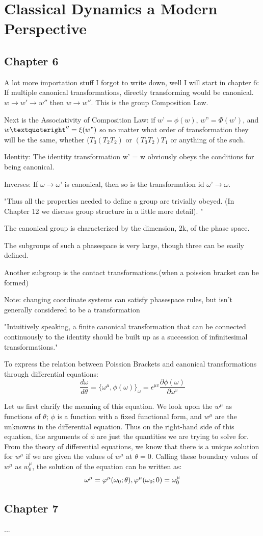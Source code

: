  \section{Classical Dynamics a Modern Perspective}
 \subsection{Chapter 6}
 A lot more importation stuff I forgot to write down, well I will start in chapter 6:
 If multiple canonical transformations, directly transforming would be canonical. $w \to w' \to w''$ then $w \to w''$. This is the group Composition Law.
 
 Next is the Associativity of Composition Law: 
 if $w’= \phi(w)$, $w” = \Phi(w’)$, and $w’'' = \xi(w")$
 so no matter what order of transformation they will be the same, whether ($T_3(T_2T_2)$ or $(T_3T_2)T_1$ or anything of the such.
 
 Identity: The identity transformation w’ = w obviously obeys the conditions for being canonical.

Inverses: If $\omega \to \omega’$ is canonical, then so is the transformation 
id $\omega’ \to \omega$. 

"Thus all the properties needed to define a group are trivially obeyed. (In 
Chapter 12 we discuss group structure in a little more detail). "

The canonical group is characterized by the dimension, 2k, 
of the phase space. 

The subgroups of such a phasespace is very large, though three can be easily defined.

Another subgroup is the contact transformations.(when a poission bracket can be formed)

Note: changing coordinate systems can satisfy phasespace rules, but isn't generally considered to be a transformation

"Intuitively speaking, a finite canonical transformation that can be 
connected continuously to the identity should be built up as a succession of 
infinitesimal transformations."

To express the relation between Poission Brackets and canonical transformations through differential equations:
$$\frac{d \omega}{d \theta}= \{\omega^\mu, \phi(\omega)\}_\omega= \epsilon^{\mu v}\frac{\partial \phi(\omega)}{\partial \omega^v}$$

Let us first clarify the meaning of this equation. We look upon the $w^\mu$ as 
functions of $\theta$; $\phi$ is a function with a fixed functional form, and $w^\mu$ are the unknowns in the differential equation. Thus on the right-hand side of this equation, the arguments of $\phi$ are just the quantities we are trying to solve for. From the theory of differential equations, we know that there is a unique solution for $w^\mu$ if we are given the values of $w^\mu$ at $\theta = 0$. Calling these boundary values of $w^\mu$ as $w^\mu_0$, the solution of the equation can be written as: 
$$\omega^\mu= \varphi^\mu(\omega_0; \theta), \space \space \space \varphi^\mu(\omega_0; 0) = \omega^\mu_0$$

\subsection{Chapter 7}
...

